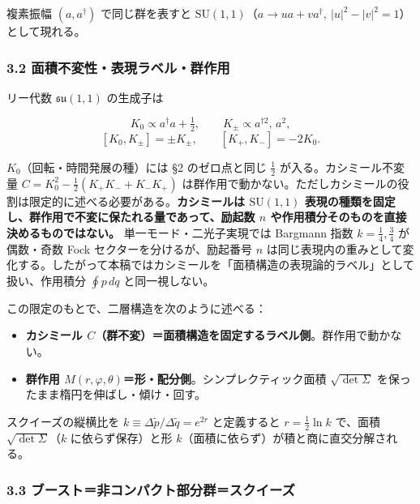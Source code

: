 \documentclass[
]{ltjsarticle}
\providecommand{\tightlist}{%
  \setlength{\itemsep}{0pt}\setlength{\parskip}{0pt}}
\begin{document}
複素振幅 \((a,a^\dagger)\) で同じ群を表すと
\(\mathrm{SU}(1,1)\)（\(a\to ua+va^\dagger,\ |u|^2-|v|^2=1\)）として現れる。

\subsubsection{3.2
面積不変性・表現ラベル・群作用}\label{ux9762ux7a4dux4e0dux5909ux6027ux8868ux73feux30e9ux30d9ux30ebux7fa4ux4f5cux7528}

リー代数 \(\mathfrak{su}(1,1)\) の生成子は

\[K_0\propto a^\dagger a+\tfrac12,\qquad K_\pm\propto a^{\dagger 2},\,a^2,\]
\[[K_0,K_\pm]=\pm K_\pm,\qquad [K_+,K_-]=-2K_0.\]

\(K_0\)（回転・時間発展の種）には §2 のゼロ点と同じ \(\tfrac12\)
が入る。カシミール不変量 \(C=K_0^2-\tfrac12(K_+K_-+K_-K_+)\)
は群作用で動かない。ただしカシミールの役割は限定的に述べる必要がある。\textbf{カシミールは
\(\mathrm{SU}(1,1)\)
表現の種類を固定し、群作用で不変に保たれる量であって、励起数 \(n\)
や作用積分そのものを直接決めるものではない。} 単一モード・二光子実現では
Bargmann 指数 \(k=\tfrac14,\tfrac34\) が偶数・奇数 Fock
セクターを分けるが、励起番号 \(n\)
は同じ表現内の重みとして変化する。したがって本稿ではカシミールを「面積構造の表現論的ラベル」として扱い、作用積分
\(\oint p\,dq\) と同一視しない。

この限定のもとで、二層構造を次のように述べる：

\begin{itemize}
\tightlist
\item
  \textbf{カシミール
  \(C\)（群不変）＝面積構造を固定するラベル側}。群作用で動かない。
\item
  \textbf{群作用
  \(M(r,\varphi,\theta)\)＝形・配分側}。シンプレクティック面積
  \(\sqrt{\det\Sigma}\) を保ったまま楕円を伸ばし・傾け・回す。
\end{itemize}

スクイーズの縦横比を \(k\equiv\Delta\tilde p/\Delta\tilde q=e^{2r}\)
と定義すると \(r=\tfrac12\ln k\) で、面積 \(\sqrt{\det\Sigma}\)（\(k\)
に依らず保存）と形 \(k\)（面積に依らず）が積と商に直交分解される。

\subsubsection{3.3
ブースト＝非コンパクト部分群＝スクイーズ}\label{ux30d6ux30fcux30b9ux30c8ux975eux30b3ux30f3ux30d1ux30afux30c8ux90e8ux5206ux7fa4ux30b9ux30afux30a4ux30fcux30ba}
\end{document}
